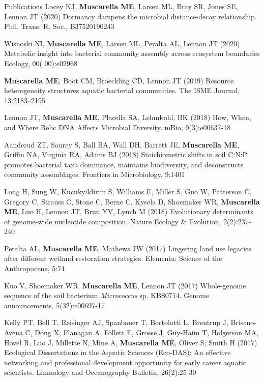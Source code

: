 \documentclass{resume} %
\begin{document}
\begin{rSection}{Publications}
Locey KJ, {\bf Muscarella ME}, Larsen ML, Bray SR, Jones SE, Lennon JT (2020)
Dormancy dampens the microbial distance-decay relationship.
Phil. Trans. R. Soc., B37520190243

Wisnoski NI, {\bf Muscarella ME}, Larsen ML, Peralta AL, Lennon JT (2020)
Metabolic insight into bacterial community assembly across ecosystem boundaries
Ecology, 00( 00):e02968

{\bf Muscarella ME}, Boot CM, Broeckling CD, Lennon JT (2019) 
Resource heterogeneity structures aquatic bacterial communities. 
The ISME Journal, 13:2183–2195

Lennon JT, {\bf Muscarella ME}, Placella SA, Lehmkuhl, BK (2018)
How, When, and Where Relic DNA Affects Microbial Diversity.
mBio, 9(3):e00637-18

Aanderud ZT, Saurey S, Ball BA, Wall DH, Barrett JE, {\bf Muscarella ME}, Griffin NA, Virginia RA, Adams BJ (2018) 
Stoichiometric shifts in soil C:N:P promotes bacterial taxa dominance, maintains biodiversity, and deconstructs community assemblages. 
Frontiers in Microbiology, 9:1401

Long H, Sung W, Kucukyildirim S, Williams E, Miller S, Guo W, Patterson C, Gregory C, Strauss C, Stone C, 
Berne C, Kysela D, Shoemaker WR, {\bf Muscarella ME}, Luo H, Lennon JT, Brun YV, Lynch M (2018) 
Evolutionary determinants of genome-wide nucleotide composition. 
Nature Ecology \& Evolution, 2(2):237-240

Peralta AL, {\bf Muscarella ME}, Mathews JW (2017) 
Lingering land use legacies after different wetland restoration strategies.
Elementa: Science of the Anthropocene, 5:74

Kuo V, Shoemaker WR, {\bf Muscarella ME}, Lennon JT (2017) 
Whole-genome sequence of the soil bacterium {\em Micrococcus} sp. KBS0714.
Genome announcements, 5(32):e00697-17

Kelly PT, Bell T, Reisinger AJ, Spanbauer T, Bortolotti L, Brentrup J, Briseno-Avena C, Dong X,  Flanagan A, Follett E, Grosse J, Guy-Haim T, 
Holgerson MA, Hovel R, Luo J, Millette N, Mine A, {\bf Muscarella ME}, Oliver S, Smith H (2017) 
Ecological Dissertations in the Aquatic Sciences (Eco-DAS): An effective networking and professional development opportunity for early career aquatic scientists.
Limnology and Oceanography Bulletin, 26(2):25-30


\end{rSection}
\end{document}
